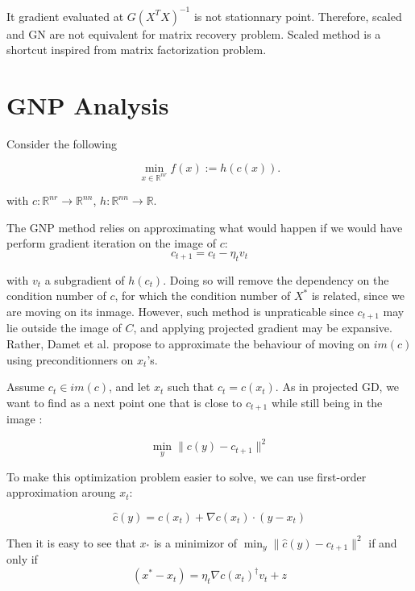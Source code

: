 \documentclass{article}
\begin{document}
It gradient evaluated at $G(X^TX)^{-1}$ is not stationnary point. Therefore, scaled and  GN are not equivalent for matrix recovery problem. Scaled method is a shortcut inspired from matrix factorization problem.







\newpage

\section{GNP Analysis}



Consider the following

$$
\min_{x\in \mathbb{R}^{nr} } f(x):= h(c(x)).

$$

with $c: \mathbb{R}^{nr} \to \mathbb{R}^{nn}$, $h:\mathbb{R}^{nn} \to \mathbb{R}$.




The GNP method relies on approximating what would happen if we would have perform gradient iteration on the image of $c$:
\begin{equation}
\label{eq:1}
    c_{t+1} = c_t - \eta_t v_t   

\end{equation}


with $v_t$ a subgradient of $h(c_t)$. Doing so will remove the dependency on the condition number of $c$, for which the condition number of $X^*$ is related, since we are moving on its inmage. However, such method is unpraticable since $c_{t+1}$ may lie outside the image of $C$, and applying projected gradient may be expansive. Rather, Damet et al. propose to approximate the behaviour of moving on $im(c)$ using preconditionners on $x_t$'s.

Assume $c_t \in im(c)$, and let $x_t$ such that $c_t = c(x_t)$. As in projected GD, we want to find as a next point one that is close to $c_{t+1}$ while still being in the image :

$$
\min_{y} \| c(y) - c_{t+1} \|^2 
$$

To make this optimization problem easier to solve, we can use first-order approximation aroung $x_t$:

$$
\hat{c}(y) = c(x_t) + \nabla c(x_t) \cdot (y-x_t)
$$

Then it is easy to see that  $x_^*$ is a minimizor of $ \min_y \| \hat{c}(y)  - c_{t+1}\|^2$ if and only if
$$
(x^*-x_t) = \eta_t \nabla c(x_t)^\dagger v_t + z
$$
\end{document}
